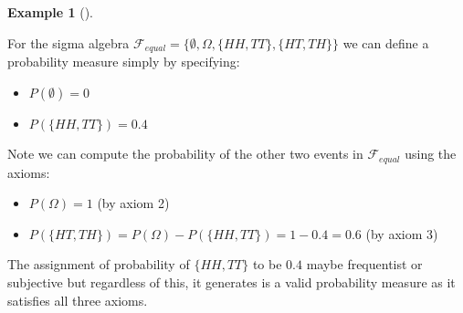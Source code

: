 \documentclass[
  letterpaper,
  DIV=11,
  numbers=noendperiod]{scrreport}
\providecommand{\tightlist}{%
  \setlength{\itemsep}{0pt}\setlength{\parskip}{0pt}}
\theoremstyle{definition}
\newtheorem{example}{Example}[chapter]
\theoremstyle{plain}
\theoremstyle{plain}
\theoremstyle{definition}
\theoremstyle{remark}
\begin{document}
\begin{tcolorbox}[enhanced jigsaw, opacitybacktitle=0.6, bottomtitle=1mm, opacityback=0, toprule=.15mm, colbacktitle=quarto-callout-note-color!10!white, colback=white, left=2mm, title={Probability measure for the equality of two coin flips}, breakable, rightrule=.15mm, leftrule=.75mm, titlerule=0mm, colframe=quarto-callout-note-color-frame, arc=.35mm, coltitle=black, toptitle=1mm, bottomrule=.15mm]

\begin{example}[]\protect\hypertarget{exm-probability-measure-equal}{}\label{exm-probability-measure-equal}

For the sigma algebra
\(\mathcal F_{equal}=\{\emptyset, \Omega, \{HH,TT\}, \{HT,TH\}\}\) we
can define a probability measure simply by specifying:

\begin{itemize}
\tightlist
\item
  \(P(\emptyset) = 0\)
\item
  \(P(\{HH,TT\}) = 0.4\)
\end{itemize}

Note we can compute the probability of the other two events in
\(\mathcal F_{equal}\) using the axioms:

\begin{itemize}
\item
  \(P(\Omega) = 1\) (by axiom 2)
\item
  \(P(\{HT,TH\}) = P(\Omega) - P(\{HH,TT\}) = 1 - 0.4 = 0.6\) (by axiom
  3)
\end{itemize}

The assignment of probability of \(\{HH,TT\}\) to be \(0.4\) maybe
frequentist or subjective but regardless of this, it generates is a
valid probability measure as it satisfies all three axioms.

\end{example}

\end{tcolorbox}
\end{document}
